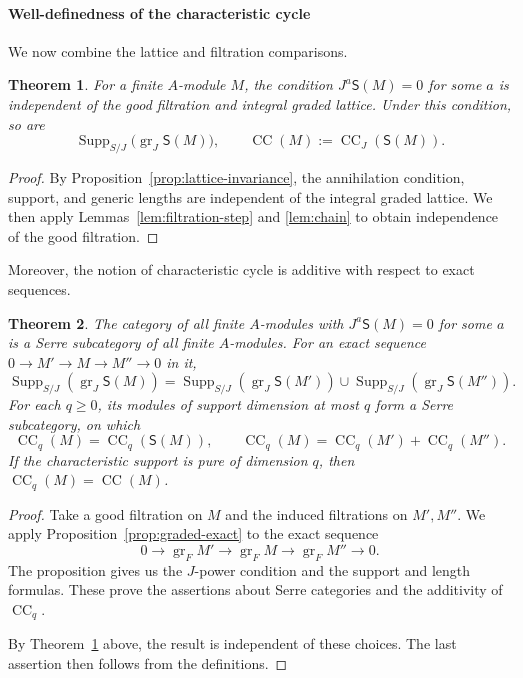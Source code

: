 \documentclass[11pt]{article}
\newtheorem{theorem}{Theorem}[section]
\theoremstyle{definition}
\newcommand{\gr}{\operatorname{gr}}
\newcommand{\CC}{\operatorname{CC}}
\newcommand{\Supp}{\operatorname{Supp}}
\begin{document}
\paragraph{Well-definedness of the characteristic cycle}
\label{sec:main}
We now combine the lattice and filtration comparisons.

\begin{theorem}\label{thm:main}
For a finite $A$-module $M$, the condition $J^a\mathsf S(M)=0$
for some $a$ is independent of the good filtration and integral
graded lattice. Under this condition, so are
\[
 \Supp_{S/J}\bigl(\gr_J\mathsf S(M)\bigr),\qquad
 \CC(M):=\CC_J(\mathsf S(M)).
\]
\end{theorem}
\begin{proof}
By Proposition~\ref{prop:lattice-invariance}, the annihilation condition,
support, and generic lengths are independent of the integral graded lattice.
We then apply Lemmas~\ref{lem:filtration-step} and \ref{lem:chain}
to obtain independence of the good filtration.
\end{proof}

Moreover, the notion of characteristic cycle is additive with respect to exact sequences.

\begin{theorem}\label{thm:additivity}
The category of all finite $A$-modules with $J^a\mathsf S(M)=0$ for some $a$ is a
Serre subcategory of all finite $A$-modules.
For an exact sequence $0\to M'\to M\to M''\to0$ in it,
\[
 \Supp_{S/J}(\gr_J\mathsf S(M))
 =\Supp_{S/J}(\gr_J\mathsf S(M'))\cup\Supp_{S/J}(\gr_J\mathsf S(M'')).
\]
For each $q\geq0$, its modules of support dimension at most $q$
form a Serre subcategory, on which
\[
 \CC_q(M)=\CC_q(\mathsf S(M)),\qquad
 \CC_q(M)=\CC_q(M')+\CC_q(M'').
\]
If the characteristic support is pure of dimension $q$, then
$\CC_q(M)=\CC(M)$.
\end{theorem}
\begin{proof}
Take a good filtration on $M$ and the induced filtrations on
$M',M''$. We apply Proposition~\ref{prop:graded-exact} to the exact sequence
\[
 0\longrightarrow\gr_FM'\longrightarrow\gr_FM
 \longrightarrow\gr_FM''\longrightarrow0.
\]
The proposition gives us the $J$-power condition and the support and length
formulas. These prove the assertions about Serre categories and the additivity of $\CC_q$.

By Theorem~\ref{thm:main} above, the result is independent of these choices.
The last assertion then 
follows from the definitions.
\end{proof}
\end{document}
